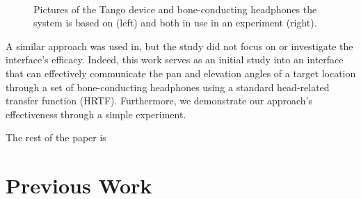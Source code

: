 \documentclass{llncs}
\begin{document}
\begin{figure}
  \centering
~
  \caption{Pictures of the Tango device and bone-conducting headphones the system is based on (left) and both in use in an experiment (right).}\label{fig:tango-headphone}
\end{figure}

A similar approach was used in\cite{durette2008visuo}, but the study did not focus on or investigate the interface's efficacy.
Indeed, this work serves as an initial study into an interface that can effectively communicate the pan and elevation angles of a target location through a set of bone-conducting headphones using a standard head-related transfer function (HRTF).
Furthermore, we demonstrate our approach's effectiveness through a simple experiment.

The rest of the paper is 

\section{Previous Work}
\end{document}
